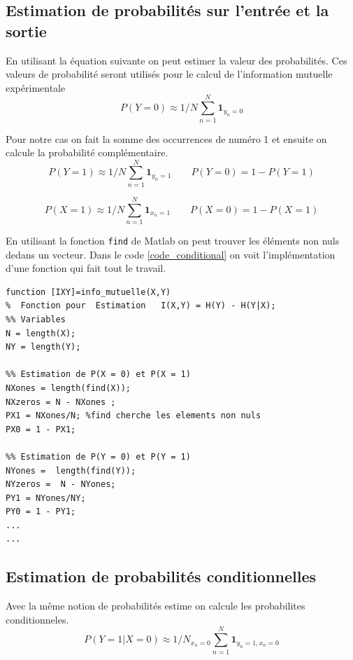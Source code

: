\documentclass{report}
\begin{document}
\subsection{Estimation de probabilités sur l'entrée et la sortie}
\label{sec:estimation}
En utilisant la équation suivante on peut estimer la valeur des probabilités. Ces valeurs de 
probabilité seront utilisés pour le calcul de l'information mutuelle expérimentale
\begin{equation}\label{eq:probconde}
P(Y=0) \approx 1/N \sum_{n=1}^{N}  \mathbf{1}_{y_n=0}
\end{equation}

Pour notre cas on fait la somme des occurrences de numéro 1 et ensuite on calcule la probabilité 
complémentaire.
\begin{equation}\label{eq:probcond}
P(Y=1) \approx 1/N \sum_{n=1}^{N}  \mathbf{1}_{y_n=1}\qquad P(Y=0) = 1 - P(Y=1)
\end{equation}

\begin{equation}\label{eq:probcondee}
P(X=1) \approx 1/N \sum_{n=1}^{N}  \mathbf{1}_{x_n=1}\qquad P(X=0) = 1 - P(X=1)
\end{equation}

En utilisant la fonction \texttt{find} de Matlab on peut trouver les éléments non nuls 
dedans un vecteur. Dans le code \ref{code_conditional} on voit l'implémentation d'une fonction
qui fait tout le travail.
\vfill
\begin{lstlisting}[caption={Code },label=code_conditional]
function [IXY]=info_mutuelle(X,Y) 
%  Fonction pour  Estimation   I(X,Y) = H(Y) - H(Y|X);
%% Variables
N = length(X);
NY = length(Y);

%% Estimation de P(X = 0) et P(X = 1)
NXones = length(find(X));
NXzeros = N - NXones ;
PX1 = NXones/N; %find cherche les elements non nuls
PX0 = 1 - PX1;

%% Estimation de P(Y = 0) et P(Y = 1)
NYones =  length(find(Y));
NYzeros =  N - NYones;
PY1 = NYones/NY;
PY0 = 1 - PY1;
...
...
\end{lstlisting}

\subsection{Estimation de probabilités conditionnelles}
Avec la même notion de probabilités estime on calcule les probabilites conditionneles.
\begin{equation}\label{key}
P(Y=1|X=0) \approx 1/N_{x_n=0} \sum_{n=1}^{N}  \mathbf{1}_{y_n=1,x_n=0} 
\end{equation}
\end{document}
